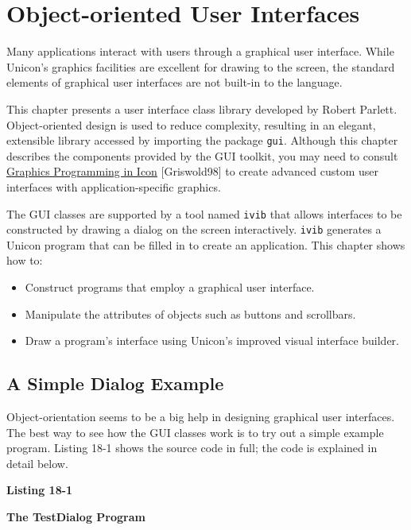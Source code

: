 \chapter{Object-oriented User Interfaces}

Many applications interact with users through a graphical
user interface. While
Unicon's graphics facilities are
excellent for drawing to the screen,
the standard elements of graphical
user interfaces are not built-in to the language.

This chapter presents a user interface class library developed by
Robert Parlett. Object-oriented design is used to reduce
complexity, resulting in an elegant, extensible library
accessed by importing the package \texttt{gui}.  Although this chapter
describes the components provided by the GUI toolkit, you may need to
consult \underline{Graphics Programming in Icon} [Griswold98] to create
advanced custom user interfaces with application-specific graphics.

The GUI classes are supported by a tool named \texttt{ivib} that
allows interfaces to be constructed by drawing a dialog on the screen
interactively. \texttt{ivib} generates a Unicon program that can be
filled in to create an application. This chapter shows how to:

\begin{itemize}
\item Construct programs that employ a graphical user interface.
\item Manipulate the attributes of objects such as buttons and scrollbars.
\item Draw a program's interface using Unicon's improved visual
      interface builder.
\end{itemize}

\section{A Simple Dialog Example}

Object-orientation seems to be a big help in designing
graphical user interfaces. The best way to see how the GUI classes
work is to try out a simple example program. Listing 18-1 shows the
source code in full; the code is explained in detail below.

{\sffamily\bfseries
Listing 18-1}

{\sffamily\bfseries
The TestDialog Program}


